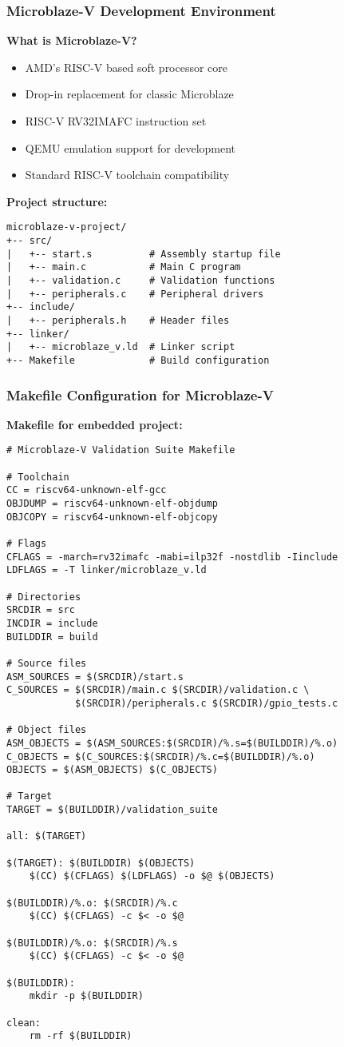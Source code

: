 \documentclass{beamer}
\begin{document}
\begin{frame}[fragile]
\frametitle{Microblaze-V Development Environment}
\textbf{What is Microblaze-V?}
\begin{itemize}
    \item AMD's RISC-V based soft processor core
    \item Drop-in replacement for classic Microblaze
    \item RISC-V RV32IMAFC instruction set
    \item QEMU emulation support for development
    \item Standard RISC-V toolchain compatibility
\end{itemize}

\textbf{Project structure:}
\begin{lstlisting}[basicstyle=\fontsize{6}{6}\selectfont\ttfamily]
microblaze-v-project/
+-- src/
|   +-- start.s          # Assembly startup file
|   +-- main.c           # Main C program
|   +-- validation.c     # Validation functions
|   +-- peripherals.c    # Peripheral drivers
+-- include/
|   +-- peripherals.h    # Header files
+-- linker/
|   +-- microblaze_v.ld  # Linker script
+-- Makefile             # Build configuration
\end{lstlisting}
\end{frame}

\begin{frame}[fragile]
\frametitle{Makefile Configuration for Microblaze-V}
\textbf{Makefile for embedded project:}
\begin{lstlisting}[basicstyle=\fontsize{5}{6}\selectfont\ttfamily]
# Microblaze-V Validation Suite Makefile

# Toolchain
CC = riscv64-unknown-elf-gcc
OBJDUMP = riscv64-unknown-elf-objdump
OBJCOPY = riscv64-unknown-elf-objcopy

# Flags
CFLAGS = -march=rv32imafc -mabi=ilp32f -nostdlib -Iinclude
LDFLAGS = -T linker/microblaze_v.ld

# Directories
SRCDIR = src
INCDIR = include
BUILDDIR = build

# Source files
ASM_SOURCES = $(SRCDIR)/start.s
C_SOURCES = $(SRCDIR)/main.c $(SRCDIR)/validation.c \
            $(SRCDIR)/peripherals.c $(SRCDIR)/gpio_tests.c

# Object files
ASM_OBJECTS = $(ASM_SOURCES:$(SRCDIR)/%.s=$(BUILDDIR)/%.o)
C_OBJECTS = $(C_SOURCES:$(SRCDIR)/%.c=$(BUILDDIR)/%.o)
OBJECTS = $(ASM_OBJECTS) $(C_OBJECTS)

# Target
TARGET = $(BUILDDIR)/validation_suite

all: $(TARGET)

$(TARGET): $(BUILDDIR) $(OBJECTS)
	$(CC) $(CFLAGS) $(LDFLAGS) -o $@ $(OBJECTS)

$(BUILDDIR)/%.o: $(SRCDIR)/%.c
	$(CC) $(CFLAGS) -c $< -o $@

$(BUILDDIR)/%.o: $(SRCDIR)/%.s
	$(CC) $(CFLAGS) -c $< -o $@

$(BUILDDIR):
	mkdir -p $(BUILDDIR)

clean:
	rm -rf $(BUILDDIR)
\end{lstlisting}
\end{frame}
\end{document}

